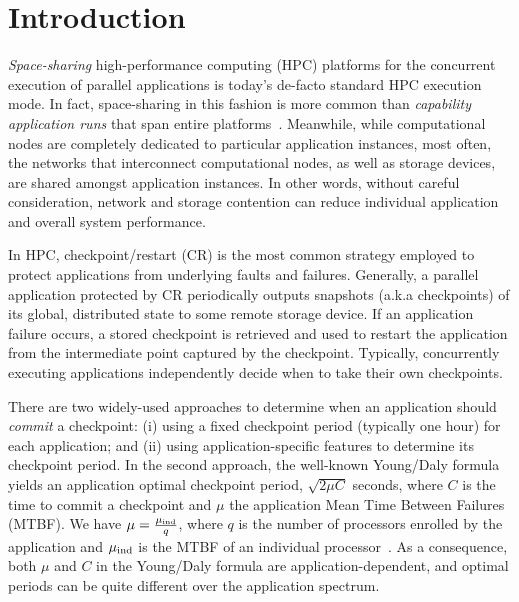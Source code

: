 
\section{Introduction}
\label{sec:intro}

\emph{Space-sharing} high-performance computing (HPC) platforms for the concurrent
execution of parallel applications is today's de-facto standard HPC execution
mode. In fact, space-sharing in this fashion is more common than \emph{capability
  application runs} that span entire platforms~\cite{Weidner2016}. Meanwhile, while
computational nodes are completely dedicated to particular application instances,
most often, the networks that interconnect computational nodes, as well as storage
devices, are shared amongst application instances. In other words, without careful
consideration, network and storage contention can reduce individual application and
overall system performance.

In HPC, checkpoint/restart (CR) is the most common strategy employed to protect
applications from underlying faults and failures. Generally, a parallel application
protected by CR periodically outputs snapshots (a.k.a checkpoints) of its global,
distributed state to some remote storage device. If an application failure occurs, a
stored checkpoint is retrieved and used to restart the application from the
intermediate point captured by the checkpoint. Typically, concurrently executing
applications independently decide when to take their own
checkpoints.

There are two widely-used approaches to determine when an
application should \emph{commit} a checkpoint: (i) using a fixed checkpoint period
(typically one hour) for each application; and (ii) using application-specific
features to determine its checkpoint period. In the second approach, the well-known
Young/Daly formula~\cite{young74,daly04} yields an application optimal checkpoint
period, $\sqrt{2 \mu C}$ seconds, where $C$ is the time to commit a checkpoint and
$\mu$ the application Mean Time Between Failures (MTBF). We have $\mu = \frac{\mu_{\text{ind}}}{q}$,
where $q$ is the number of processors enrolled by the application and $\mu_{\text{ind}}$ is the
MTBF of an individual processor~\cite{springer-monograph}. As a consequence, both
$\mu$ and $C$ in the Young/Daly formula are application-dependent, and optimal
periods can be quite different over the application spectrum.

